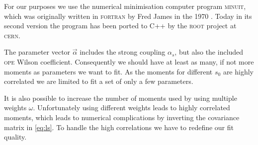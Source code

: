 \documentclass[../../index.tex]{subfiles}
\begin{document}
For our purposes we use the numerical minimisation computer program
\textsc{minuit}, which was originally written in \textsc{fortran} by Fred James
in the 1970 \cite{James1975}. Today in its second version the program has been ported to C++ by
the \textsc{root} \cite{Brun1997} project at \textsc{cern}.

The parameter vector \(\vec\alpha\) includes the strong coupling \(\alpha_s\),
but also the included \textsc{ope} Wilson coefficient. Consequently we should
have at least as many, if not more moments as parameters we want to fit. As the
moments for different \(s_0\) are highly correlated we are limited to fit a set
of only a few parameters.

It is also possible to increase the number of moments used by using multiple
weights \(\omega\). Unfortunately using different weights leads to highly
correlated moments, which leads to numerical complications by inverting the
covariance matrix in \cref{eq:ls}. To handle the high correlations we have to
redefine our fit quality.
\end{document}

